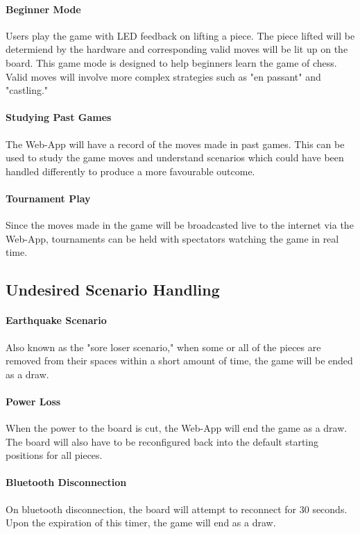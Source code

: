 \documentclass[12pt]{article}
\begin{document}
{{    \paragraph{Beginner Mode}{
        Users play the game with LED feedback on lifting a piece. The piece lifted will be determiend by the hardware and corresponding valid moves will be lit up on the board. This game
        mode is designed to help beginners learn the game of chess. Valid moves will involve more complex strategies such as "en passant" and "castling."
    }
        
    \paragraph{Studying Past Games}{
        The Web-App will have a record of the moves made in past games. This can be used to study the game moves and understand scenarios which could have been handled differently
        to produce a more favourable outcome.
    }
    
    \paragraph{Tournament Play}{
        Since the moves made in the game will be broadcasted live to the internet via the Web-App, tournaments can be held with spectators watching the game in real time.
    }
}

\subsection{Undesired Scenario Handling}{
    \paragraph{Earthquake Scenario}{
        Also known as the "sore loser scenario," when some or all of the pieces are removed from their spaces within a short amount of time, the game will be ended as a draw. 
    }
    
    \paragraph{Power Loss}{
        When the power to the board is cut, the Web-App will end the game as a draw. The board will also have to be reconfigured back into the default starting positions for all pieces.
    }
    
    \paragraph{Bluetooth Disconnection}{
        On bluetooth disconnection, the board will attempt to reconnect for 30 seconds. Upon the expiration of this timer, the game will end as a draw.
    }
    
}}
\end{document}
